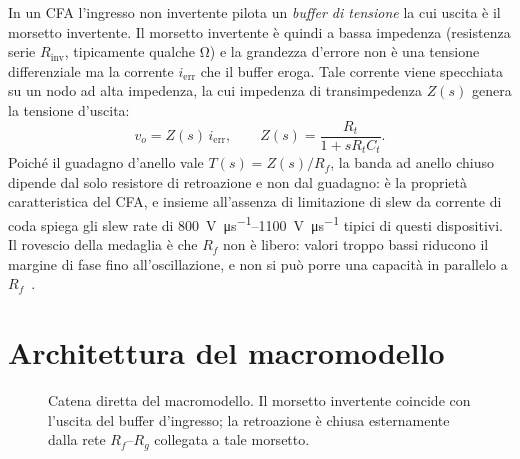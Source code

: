 \documentclass[11pt,a4paper]{article}
\begin{document}
In un CFA l'ingresso non invertente pilota un \emph{buffer di tensione} la
cui uscita è il morsetto invertente. Il morsetto invertente è quindi a bassa
impedenza (resistenza serie $R_{\mathrm{inv}}$, tipicamente qualche
\si{\ohm}) e la grandezza d'errore non è una tensione differenziale ma la
corrente $i_{\mathrm{err}}$ che il buffer eroga. Tale corrente viene
specchiata su un nodo ad alta impedenza, la cui impedenza di transimpedenza
$Z(s)$ genera la tensione d'uscita:
\begin{equation}
  v_{o} = Z(s)\, i_{\mathrm{err}},
  \qquad
  Z(s) = \frac{R_t}{1+s R_t C_t}.
\end{equation}
Poiché il guadagno d'anello vale $T(s)=Z(s)/R_f$, la banda ad anello chiuso
dipende dal solo resistore di retroazione e non dal guadagno: è la proprietà
caratteristica del CFA, e insieme all'assenza di limitazione di slew da
corrente di coda spiega gli slew rate di
\SIrange{800}{1100}{\volt\per\micro\second} tipici di questi dispositivi.
Il rovescio della medaglia è che $R_f$ non è libero: valori troppo bassi
riducono il margine di fase fino all'oscillazione, e non si può porre una
capacità in parallelo a $R_f$~\cite{ltdatasheet,franco}.

\section{Architettura del macromodello}

\begin{figure}[h]
\centering
{}

\caption{Catena diretta del macromodello. Il morsetto invertente coincide
con l'uscita del buffer d'ingresso; la retroazione è chiusa esternamente
dalla rete $R_f$--$R_g$ collegata a tale morsetto.}
\end{figure}
\end{document}
